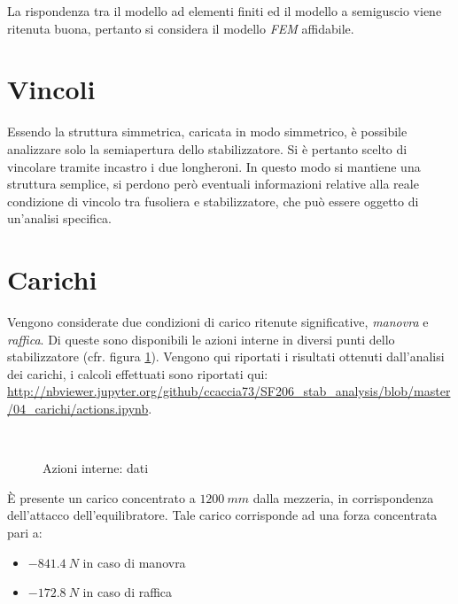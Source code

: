 \documentclass[
10pt, %
a4paper, %
oneside, %
headinclude,footinclude, %
BCOR5mm, %
]{scrartcl}
\begin{document}
La rispondenza tra il modello ad elementi finiti ed il modello a semiguscio viene ritenuta buona, pertanto si considera il modello \emph{FEM} affidabile.

\newpage


\section{Vincoli}
\label{sec:vincoli}

Essendo la struttura simmetrica, caricata in modo simmetrico, è possibile analizzare solo la semiapertura dello stabilizzatore. Si è pertanto scelto di vincolare tramite incastro i due longheroni. In questo modo si mantiene una struttura semplice, si perdono però eventuali informazioni relative alla reale condizione di vincolo tra fusoliera e stabilizzatore, che può essere oggetto di un'analisi specifica.

\newpage

\section{Carichi}

Vengono considerate due condizioni di carico ritenute significative, \emph{manovra} e \emph{raffica}. Di queste sono disponibili le azioni interne in diversi punti dello stabilizzatore (cfr. figura \ref{fig:az_dati}). Vengono qui riportati i risultati ottenuti dall'analisi dei carichi, i calcoli effettuati sono riportati qui: \url{http://nbviewer.jupyter.org/github/ccaccia73/SF206_stab_analysis/blob/master/04_carichi/actions.ipynb}.

\begin{figure}[htb]
	\centering
	 \
	 \\
	\caption[azioni interne: dati]{Azioni interne: dati} %
	\label{fig:az_dati}
\end{figure}

\`{E} presente un carico concentrato a $1200 \ mm$ dalla mezzeria, in corrispondenza dell'attacco dell'equilibratore. Tale carico corrisponde ad una forza concentrata pari a:

\begin{itemize}
	\item $-841.4 \ N$ in caso di manovra
	\item $-172.8 \ N $ in caso di raffica
\end{itemize}
\end{document}
